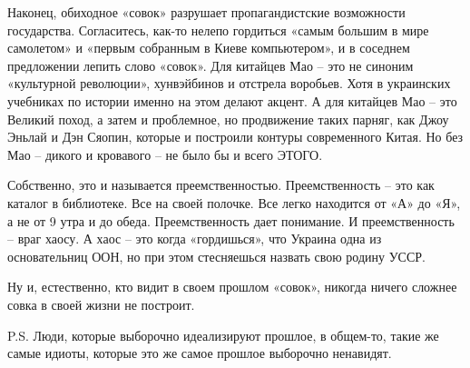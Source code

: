 Наконец, обиходное «совок» разрушает пропагандистские возможности государства.
Согласитесь, как-то нелепо гордиться «самым большим в мире самолетом» и «первым
собранным в Киеве компьютером», и в соседнем предложении лепить слово «совок».
Для китайцев Мао – это не синоним «культурной революции», хунвэйбинов и
отстрела воробьев. Хотя в украинских учебниках по истории именно на этом делают
акцент. А для китайцев Мао – это Великий поход, а затем и проблемное, но
продвижение таких парняг, как Джоу Эньлай и Дэн Сяопин, которые и построили
контуры современного Китая. Но без Мао – дикого и кровавого – не было бы и
всего ЭТОГО.

Собственно, это и называется преемственностью. Преемственность – это как
каталог в библиотеке. Все на своей полочке. Все легко находится от «А» до «Я»,
а не от 9 утра и до обеда. Преемственность дает понимание. И преемственность –
враг хаосу. А хаос – это когда «гордишься», что Украина одна из основательниц
ООН, но при этом стесняешься назвать свою родину УССР.

Ну и, естественно, кто видит в своем прошлом «совок», никогда ничего сложнее
совка в своей жизни не построит.

P.S. Люди, которые выборочно идеализируют прошлое, в общем-то, такие же самые
идиоты, которые это же самое прошлое выборочно ненавидят.


